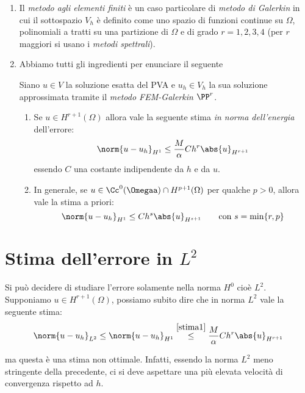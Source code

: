 \begin{enumerate}
    \item Il \emph{metodo agli elementi finiti} è un caso particolare di \emph{metodo di Galerkin} in cui il sottospazio $V_h$ è definito come uno spazio di funzioni continue su $\Omega$, polinomiali a tratti su una partizione di $\Omega$ e di grado $r=1,2,3,4$ (per $r$ maggiori si usano i \emph{metodi spettrali}). 

    \item Abbiamo tutti gli ingredienti per enunciare il seguente
    \begin{thm}
    Siano $u\in V$ la soluzione esatta del PVA e $u_h\in V_h$ la sua soluzione approssimata tramite il \emph{metodo FEM-Galerkin} $\PP^r$. 

    \begin{enumerate}
        \item Se $u\in H^{r+1}(\Omega)$ allora vale la seguente stima \emph{in norma dell'energia} dell'errore:
        \begin{equation}\label{stima1}
        \norm{u-u_h}_{H^1}\leq \frac{M}{\alpha} Ch^r\abs{u}_{H^{r+1}}
        \end{equation}
        essendo $C$ una costante indipendente da $h$ e da $u$.

        \item In generale, se $u\in\Cc^0(\Omegaa)\cap H^{p+1}(\Omega)$ per qualche $p>0$, allora vale la stima a priori:
        \begin{equation}\label{stima2}
        \norm{u-u_h}_{H^1}\leq Ch^s\abs{u}_{H^{s+1}}\qquad \text{con } s=\min\{r,p\}
        \end{equation}
    \end{enumerate}
    \end{thm}
\end{enumerate}

\section{Stima dell'errore in \texorpdfstring{$L^2$}{C}}

Si può decidere di studiare l'errore solamente nella norma $H^0$ cioè $L^2$. Supponiamo $u\in H^{r+1}(\Omega)$, possiamo subito dire che in norma $L^2$ vale la seguente stima:
\begin{equation*}
\norm{u-u_h}_{L^2}\leq \norm{u-u_h}_{H^1}\overset{\eqref{stima1}}{\leq} \frac{M}{\alpha} Ch^r\abs{u}_{H^{r+1}}
\end{equation*}

ma questa è una stima non ottimale. Infatti, essendo la norma $L^2$ meno stringente della precedente, ci si deve aspettare una più elevata velocità di convergenza rispetto ad $h$.

